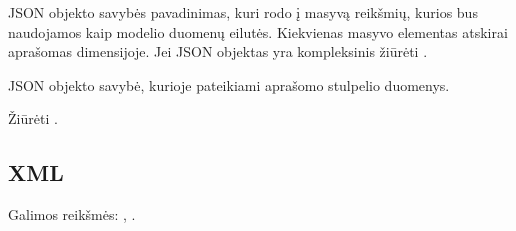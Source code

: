 \documentclass[letterpaper,10pt,lithuanian]{sphinxmanual}
\begin{document}
\begin{fulllineitems}

\pysigstartsignatures
{}
\pysigstopsignatures
\sphinxAtStartPar
JSON objekto savybės pavadinimas, kuri rodo į masyvą reikšmių, kurios bus
naudojamos kaip modelio duomenų eilutės. Kiekvienas masyvo elementas
atskirai aprašomas {\hyperref[\detokenize{formatas:property}]{}} dimensijoje. Jei JSON objektas yra
kompleksinis žiūrėti {\hyperref[\detokenize{formules:kompleksines-strukturos}]{}}.

\end{fulllineitems}



\begin{fulllineitems}

\pysigstartsignatures
{}
\pysigstopsignatures
\sphinxAtStartPar
JSON objekto savybė, kurioje pateikiami aprašomo stulpelio duomenys.

\end{fulllineitems}



\begin{fulllineitems}

\pysigstartsignatures
{}
\pysigstopsignatures
\sphinxAtStartPar
Žiūrėti {\hyperref[\detokenize{formules:kompleksines-strukturos}]{}}.

\end{fulllineitems}



\subsection{XML}
\label{\detokenize{saltiniai:xml}}

\begin{fulllineitems}

\pysigstartsignatures
{}
\pysigstopsignatures
\sphinxAtStartPar
Galimos reikšmės: , .

\end{fulllineitems}
\end{document}
